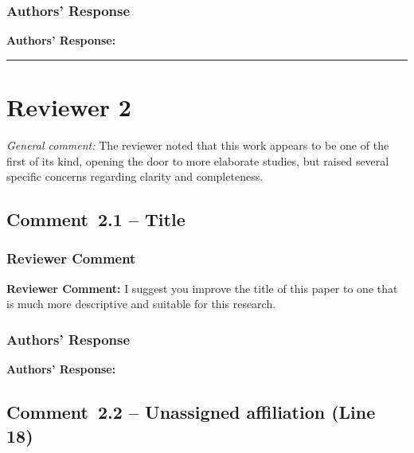 \documentclass[12pt]{article}
\newcommand{\reviewlabel}{\textbf{\textcolor{commentframe}{Reviewer Comment:}}}
\newcommand{\responselabel}{\textbf{\textcolor{responseframe}{Authors' Response:}}}
\begin{document}
\subsubsection{Authors' Response}
\begin{responsebox}
\responselabel{}

\end{responsebox}

\bigskip
\hrule
\bigskip

\section{Reviewer 2}

\textit{General comment:} The reviewer noted that this work appears to be one
of the first of its kind, opening the door to more elaborate studies, but
raised several specific concerns regarding clarity and completeness.

\subsection{Comment~2.1 -- Title}

\subsubsection{Reviewer Comment}
\begin{reviewerbox}
\reviewlabel{} I suggest you improve the title of this paper to one that is
much more descriptive and suitable for this research.
\end{reviewerbox}

\subsubsection{Authors' Response}
\begin{responsebox}
\responselabel{}

\end{responsebox}

\subsection{Comment~2.2 -- Unassigned affiliation (Line 18)}
\end{document}
